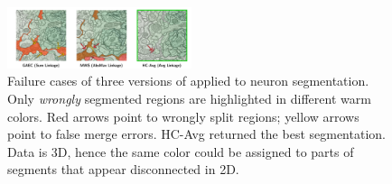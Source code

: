 





\begin{figure}
\centering
\includegraphics[width=0.48\textwidth,trim=0 10 60 0, clip]{./figs/comparison_GAEC_MWS_Avg.pdf} %
\caption{Failure cases of three versions of \algname{} applied to neuron segmentation. Only \emph{wrongly} segmented regions are highlighted in different warm colors. Red arrows point to wrongly split regions; yellow arrows point to false merge errors. HC-Avg returned the best segmentation. Data is 3D, hence the same color could be assigned to parts of segments that appear disconnected in 2D.  
\label{fig:failure_cases}}
\end{figure}






